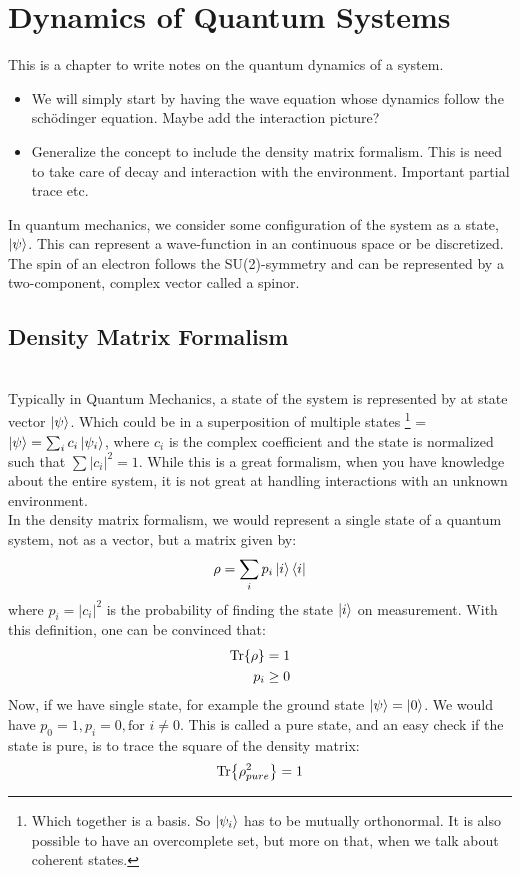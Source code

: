 \chapter{Dynamics of Quantum Systems} \label{sec: Quantum Maps}
This is a chapter to write notes on the quantum dynamics of a system.
\begin{itemize}
    \item We will simply start by having the wave equation whose dynamics follow the schödinger equation. Maybe add the interaction picture? 
    \item Generalize the concept to include the density matrix formalism. This  is need to take care of decay and interaction with the environment. Important partial trace etc.
\end{itemize}
In quantum mechanics, we consider some configuration of the system as a state, $\ket{\psi}$. This can represent a wave-function in an continuous space or be discretized. The spin of an electron follows the SU(2)-symmetry and can be represented by a two-component, complex vector called a spinor.  

\section{Density Matrix Formalism}
\\ 
Typically in Quantum Mechanics, a state of the system is represented by at state vector $\ket{\psi}$. Which could be in a superposition of multiple states \footnote{Which together is a basis. So {$\ket{\psi_i}$} has to be mutually orthonormal. It is also possible to have an overcomplete set, but more on that, when we talk about coherent states.} = $\ket{\psi} = \sum_i c_i\ket{\psi_i}$, where $c_i$ is the complex coefficient and the state is normalized such that $\sum |c_i|^2 = 1$. While this is a great formalism, when you have knowledge about the entire system, it is not great at handling interactions with an unknown environment. 
\\
In the density matrix formalism, we would represent a single state of a quantum system, not as a vector, but a matrix given by:
\begin{equation}
    \rho = \sum_i p_i \ket{i}\bra{i}
\end{equation}
where $p_i = |c_i|^2$ is the probability of finding the state $\ket{i}$ on measurement. With this definition, one can be convinced that:
\begin{align}
    \Tr{\rho} &= 1 \\
    p_i &\geq 0
\end{align}
Now, if we have single state, for example the ground state $\ket{\psi} = \ket{0}$. We would have $p_0 = 1, p_i = 0, \text{for } i \neq 0$. This is called a pure state, and an easy check if the state is pure, is to trace the square of the density matrix:
\begin{equation}
    \Tr{\rho_{pure}^2} = 1
\end{equation}

